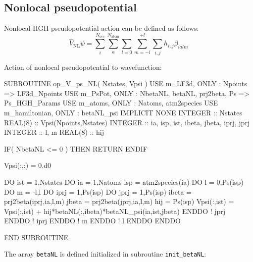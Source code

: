 \subsection{Nonlocal pseudopotential}

Nonlocal HGH pseudopotential action can be defined as follows:
\begin{equation}
\hat{V}_{\mathrm{NL}} \psi =
\sum_{i}^{N_{\mathrm{occ}}} \sum_{a}^{N_{\mathrm{atom}}}
\sum_{l=0}\sum_{m=-l}^{+l} \sum_{i,j}
h_{i,j} \beta_{ialm}
\end{equation}

Action of nonlocal pseudopotential to wavefunction:

\begin{fortrancode}
SUBROUTINE op_V_ps_NL( Nstates, Vpsi )
  USE m_LF3d, ONLY : Npoints => LF3d_Npoints
  USE m_PsPot, ONLY : NbetaNL, betaNL, prj2beta, Ps => Ps_HGH_Params
  USE m_atoms, ONLY : Natoms, atm2species
  USE m_hamiltonian, ONLY : betaNL_psi
  IMPLICIT NONE
  INTEGER :: Nstates
  REAL(8) :: Vpsi(Npoints,Nstates)
  INTEGER :: ia, isp, ist, ibeta, jbeta, iprj, jprj
  INTEGER :: l, m
  REAL(8) :: hij

  IF( NbetaNL <= 0 ) THEN
    RETURN
  ENDIF

  Vpsi(:,:) = 0.d0

  DO ist = 1,Nstates
    DO ia = 1,Natoms
      isp = atm2species(ia)
      DO l = 0,Ps(isp)%
      DO m = -l,l
        DO iprj = 1,Ps(isp)%
        DO jprj = 1,Ps(isp)%
          ibeta = prj2beta(iprj,ia,l,m)
          jbeta = prj2beta(jprj,ia,l,m)
          hij = Ps(isp)%
          Vpsi(:,ist) = Vpsi(:,ist) + hij*betaNL(:,ibeta)*betaNL_psi(ia,ist,jbeta)
        ENDDO ! jprj
        ENDDO ! iprj
      ENDDO ! m
      ENDDO ! l
    ENDDO
  ENDDO

END SUBROUTINE
\end{fortrancode}

The array {\tt betaNL} is defined initialized in subroutine {\tt init\_betaNL}:

